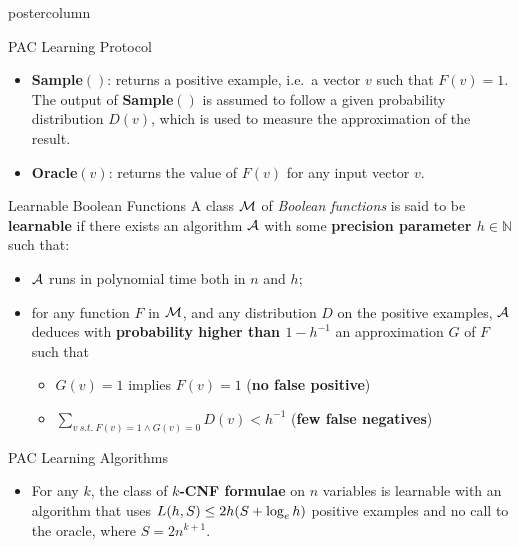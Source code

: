 \documentclass[final,hyperref={pdfpagelabels=false},xcolor=dvipsnames]{beamer}
\begin{document}
\begin{frame}[fragile]
\begin{columns}
\begin{column}{.49\textwidth}
\begin{beamercolorbox}[center,wd=\textwidth]{postercolumn}
\begin{minipage}[T]{.95\textwidth}
{\begin{block}{PAC Learning Protocol}
\begin{itemize}
  \item
{\bf Sample}$()$: returns a positive example, i.e.~a vector $v$ such that $F(v)=1$.
The output of {\bf Sample}$()$ is assumed to follow a given probability distribution $D(v)$, which is used to measure the approximation of the result.
  \item
{\bf Oracle}$(v)$: returns the value of $F(v)$ for any input vector $v$.
\end{itemize}
            \end{block}
            \vfill
            \begin{block}{Learnable Boolean Functions \cite{Valiant84cacm}}
   A class $\cal M$ of \emph{Boolean functions} is said to be {\bf learnable}
   if there exists an algorithm $\cal A$ with some {\bf precision parameter $h\in\mathbb N$} such that:
   \begin{itemize}
      \item $\cal A$ runs in polynomial time both in $n$ and $h$;
      \item
         for any function $F$ in $\cal M$, and any distribution $D$ on the positive examples,
         $\cal A$ deduces with {\bf probability higher than $1-h^{-1}$} an approximation $G$ of $F$ such that
         \begin{itemize}
            \item $G(v)=1$ implies $F(v)=1$ ({\bf no false positive})
            \item
               $\displaystyle\sum_{v\ s.t.\ F(v)=1\wedge G(v)=0} D(v) < h^{-1}$ ({\bf few false negatives})
         \end{itemize}
   \end{itemize}
            \end{block}
            \vfill
            \begin{block}{PAC Learning Algorithms \cite{Valiant84cacm}}
\begin{itemize}
\item
For any $k$, the class of {\bf $k$-CNF formulae} on $n$ variables is learnable with an
algorithm that uses $L(h,S)\small\le 2h(S+\log_e h)$ positive examples and no call to the
oracle, where $S=2n^{k+1}$.
\begin{enumerate}

\end{enumerate}
\end{itemize}
\end{block}}
\end{minipage}
\end{beamercolorbox}
\end{column}
\end{columns}
\end{frame}
\end{document}
